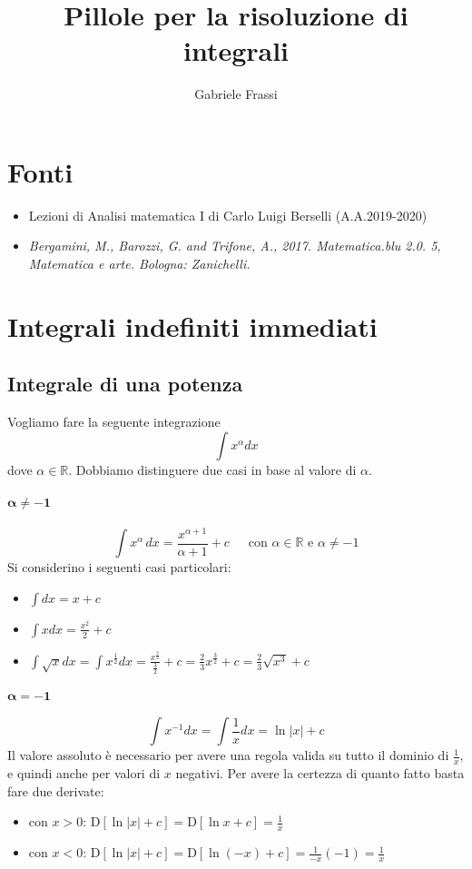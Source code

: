 \documentclass[11pt]{article}
\begin{document}
\title{Pillole per la risoluzione di integrali}
\author{Gabriele Frassi}
\maketitle
\tableofcontents


\section*{Fonti}
\begin{itemize}
	\item Lezioni di Analisi matematica I di Carlo Luigi Berselli (A.A.2019-2020)
	\item \textit{Bergamini, M., Barozzi, G. and Trifone, A., 2017. Matematica.blu 2.0. 5, Matematica e arte. Bologna: Zanichelli.}
\end{itemize}
\section{Integrali indefiniti immediati}
\subsection{Integrale di una potenza}
Vogliamo fare la seguente integrazione
\[\int x^\alpha dx\]
dove $\alpha \in \mathbb{R}$. Dobbiamo distinguere due casi in base al valore di $\alpha$.
\paragraph{$\mathbf{\alpha\neq -1}$}
\[\boxed{\int x^\alpha\, dx=\frac{x^{\alpha+1}}{\alpha+1}+c\,\,\,\,\,\,\,\,\,\text{con }\alpha \in \mathbb{R}\text{ e }\alpha \neq -1}\]
Si considerino i seguenti casi particolari:
\begin{itemize}
	\item $\int dx = x+ c$
	\item $\int x dx = \frac{x^2}{2}+c$
	\item $\int \sqrt{x} dx = \int x^{\frac{1}{2}}dx=\frac{x^{\frac{3}{2}}}{\frac{3}{2}}+c=\frac{2}{3} x^{\frac{3}{2}}+c = \frac{2}{3}\sqrt{x^3}+c$
\end{itemize}
\paragraph{$\mathbf{\alpha = -1}$}
\[\boxed{\int x^{-1} dx = \int \frac{1}{x} dx = \ln |x| + c }\]
Il valore assoluto è necessario per avere una regola valida su tutto il dominio di $\frac{1}{x}$, e quindi anche per valori di $x$ negativi. Per avere la certezza di quanto fatto basta fare due derivate:
\begin{itemize}
	\item con $x > 0$: $\text{D}\left[\ln |x|+c\right]=\text{D}\left[\ln x+c\right]=\frac{1}{x}$
	\item con $x < 0$: $\text{D}\left[\ln |x|+c\right]=\text{D}\left[\ln (-x)+c\right]=\frac{1}{-x}(-1)=\frac{1}{x}$
\end{itemize}
\end{document}
